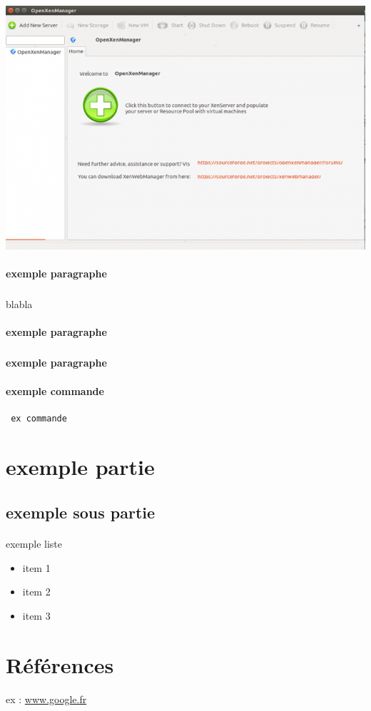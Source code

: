 \documentclass[a4paper,12pt]{article}
\begin{document}
\includegraphics{openxenmanager}


\paragraph{exemple paragraphe}
\subparagraph{}
blabla

\paragraph{exemple paragraphe}
\subparagraph{}

\paragraph{exemple paragraphe}
\paragraph{}

\paragraph{exemple commande}
\begin{verbatim}
 ex commande
\end{verbatim}

\clearpage
\section{exemple partie}
\subsection{exemple sous partie}
\paragraph{}

exemple liste
\begin{itemize}
\item item 1
\item item 2 
\item item 3
\end{itemize}


\clearpage
\section{Références}

ex :
\url{www.google.fr}\
\end{document}
